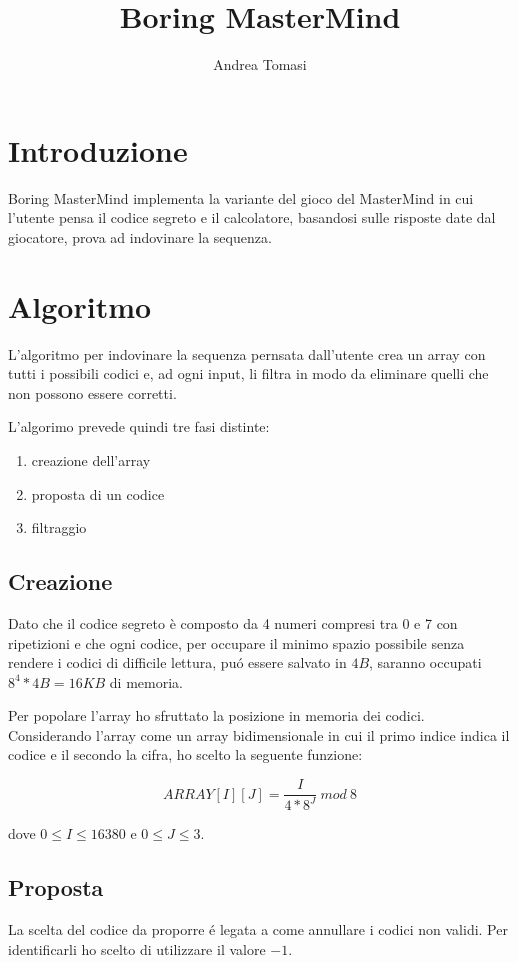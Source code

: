 \documentclass{article}
\title{Boring MasterMind}
\author{Andrea Tomasi}
\begin{document}
\maketitle

\section{Introduzione}
Boring MasterMind implementa la variante del gioco del MasterMind in cui l'utente pensa il codice segreto e il calcolatore, basandosi sulle risposte date dal giocatore, prova ad indovinare la sequenza.

\section{Algoritmo}
L'algoritmo per indovinare la sequenza pernsata dall'utente crea un array con tutti i possibili codici e, ad ogni input, li filtra in modo da eliminare quelli che non possono essere corretti.

L'algorimo prevede quindi tre fasi distinte:
\begin{enumerate}
\item creazione dell'array
\item proposta di un codice
\item filtraggio
\end{enumerate}

\subsection{Creazione}
Dato che il codice segreto \`e composto da 4 numeri compresi tra 0 e 7 con ripetizioni e che ogni codice, per occupare il minimo spazio possibile senza rendere i codici di difficile lettura, pu\'o essere salvato in $4B$, saranno occupati $8^4*4B = 16KB$ di memoria.

Per popolare l'array ho sfruttato la posizione in memoria dei codici. Considerando l'array come un array bidimensionale in cui il primo indice indica il codice e il secondo la cifra, ho scelto la seguente funzione: 
  
$$ARRAY[I][J] = \frac{I}{4*8^J}\ mod\ 8$$

dove $0 \le I \le 16380$ e $ 0 \le J \le 3$. 

\subsection{Proposta}
La scelta del codice da proporre \'e legata a come annullare i codici non validi. Per identificarli ho scelto di utilizzare il valore $-1$. 
\end{document}
